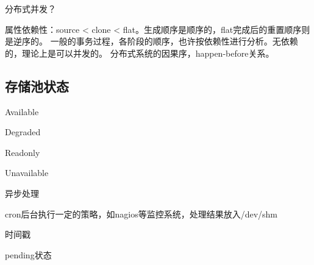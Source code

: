 分布式并发？

属性依赖性：source < clone < flat。生成顺序是顺序的，flat完成后的重置顺序则是逆序的。
一般的事务过程，各阶段的顺序，也许按依赖性进行分析。无依赖的，理论上是可以并发的。
分布式系统的因果序，happen-before关系。

\subsection{存储池状态}

\begin{compactitem}
\item Available
\item Degraded
\item Readonly
\item Unavailable
\end{compactitem}

异步处理

cron后台执行一定的策略，如nagios等监控系统，处理结果放入/dev/shm

时间戳

pending状态
